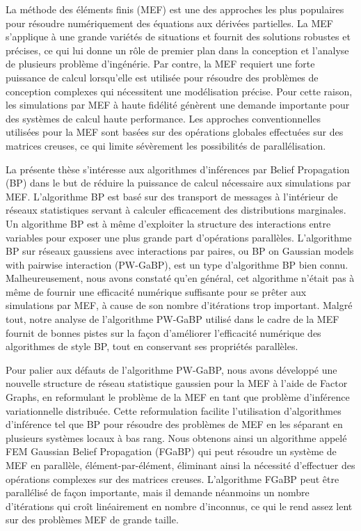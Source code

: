 \documentclass [12pt,letterpaper]{report}
\begin{document}
La m\'ethode des \'el\'ements finis (MEF) est une des approches les plus populaires pour r\'esoudre num\'eriquement des \'equations aux d\'eriv\'ees partielles.
La MEF s'applique \`a une grande vari\'et\'es de situations et fournit des solutions robustes et pr\'ecises, ce qui lui donne un r\^ole de premier plan dans la conception et l'analyse de plusieurs probl\`eme d'ing\'en\'erie.
Par contre, la MEF requiert une forte puissance de calcul lorsqu'elle est utilis\'ee pour r\'esoudre des probl\`emes de conception complexes qui n\'ecessitent une mod\'elisation pr\'ecise.
Pour cette raison, les simulations par MEF \`a haute fid\'elit\'e g\'en\`erent une demande importante pour des syst\`emes de calcul haute performance.
Les approches conventionnelles utilis\'ees pour la MEF sont bas\'ees sur des op\'erations globales effectu\'ees sur des matrices creuses, ce qui limite s\'ev\`erement les possibilit\'es de parall\'elisation.

La pr\'esente th\`ese s'int\'eresse aux algorithmes d'inf\'erences par Belief Propagation (BP) dans le but de r\'eduire la puissance de calcul n\'ecessaire aux simulations par MEF.
L'algorithme BP est bas\'e sur des transport de messages \`a l'int\'erieur de r\'eseaux statistiques servant \`a calculer efficacement des distributions marginales.
Un algorithme BP est \`a m\^eme d'exploiter la structure des interactions entre variables pour exposer une plus grande part d'op\'erations parall\`eles. L'algorithme BP sur r\'eseaux gaussiens avec interactions par paires, ou BP on Gaussian models with pairwise interaction (PW-GaBP), est un type d'algorithme BP bien connu.
Malheureusement, nous avons constat\'e qu'en g\'en\'eral, cet algorithme n'\'etait pas \`a m\^eme de fournir une efficacit\'e num\'erique suffisante pour se pr\^eter aux simulations par MEF, \`a cause de son nombre d'it\'erations trop important.
Malgr\'e tout, notre analyse de l'algorithme PW-GaBP utilis\'e dans le cadre de la MEF fournit de bonnes pistes sur la fa\c{c}on d'am\'eliorer l'efficacit\'e num\'erique des algorithmes de style BP, tout en conservant ses propri\'et\'es parall\`eles.

Pour palier aux d\'efauts de l'algorithme PW-GaBP, nous avons d\'evelopp\'e une nouvelle structure de r\'eseau statistique gaussien pour la MEF \`a l'aide de Factor Graphs, en reformulant le probl\`eme de la MEF en tant que probl\`eme d'inf\'erence variationnelle distribu\'ee. Cette reformulation facilite l'utilisation d'algorithmes d'inf\'erence tel que BP pour r\'esoudre des probl\`emes de MEF en les s\'eparant en plusieurs syst\`emes locaux \`a bas rang.
Nous obtenons ainsi un algorithme appel\'e FEM Gaussian Belief Propagation (FGaBP) qui peut r\'esoudre un syst\`eme de MEF en parall\`ele, \'el\'ement-par-\'el\'ement, \'eliminant ainsi la n\'ecessit\'e d'effectuer des op\'erations complexes sur des matrices creuses.
L'algorithme FGaBP peut \^etre parall\'elis\'e de fa\c{c}on importante, mais il demande n\'eanmoins un nombre d'it\'erations qui cro\^it lin\'eairement en nombre d'inconnus, ce qui le rend assez lent sur des probl\`emes MEF de grande taille.
\end{document}
